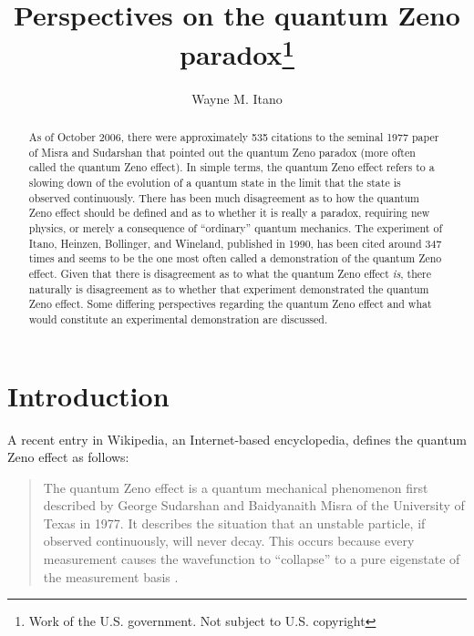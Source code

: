 \documentclass[letterpaper]{jpconf}
\begin{document}
\title{Perspectives on the quantum Zeno paradox\footnote{Work of the U.S. government.  Not subject to U.S. copyright}}
\author{Wayne M. Itano}

\address{Time and Frequency Division, National Institute of Standards and Technology, Boulder, CO 80305 USA}


\begin{abstract}
As of October 2006, there were approximately 535 citations to the
seminal 1977 paper of Misra and Sudarshan that pointed out the
quantum Zeno paradox (more often called the quantum Zeno effect). In
simple terms, the quantum Zeno effect refers to a slowing down of
the evolution of a quantum state in the limit that the state is
observed continuously. There has been much disagreement as to how
the quantum Zeno effect should be defined and as to whether it is
really a paradox, requiring new physics, or merely a consequence of
``ordinary'' quantum mechanics.  The experiment of Itano, Heinzen,
Bollinger, and Wineland, published in 1990, has been cited around
347 times and seems to be the one most often called a demonstration
of the quantum Zeno effect. Given that there is disagreement as to
what the quantum Zeno effect {\em is}, there naturally is
disagreement as to whether that experiment demonstrated the quantum
Zeno effect. Some differing perspectives regarding the quantum Zeno
effect and what would constitute an experimental demonstration are
discussed.

\end{abstract}

\section{Introduction}

A recent entry in  Wikipedia, an Internet-based encyclopedia,
defines the quantum Zeno effect as follows:

\begin{quote}The quantum Zeno effect is a quantum mechanical phenomenon
first described by George Sudarshan and Baidyanaith Misra of the
University of Texas in 1977. It describes the situation that an
unstable particle, if observed continuously, will never decay. This
occurs because every measurement causes the wavefunction to
``collapse'' to a pure eigenstate of the measurement basis
\cite{wiki}.
\end{quote}
\end{document}
